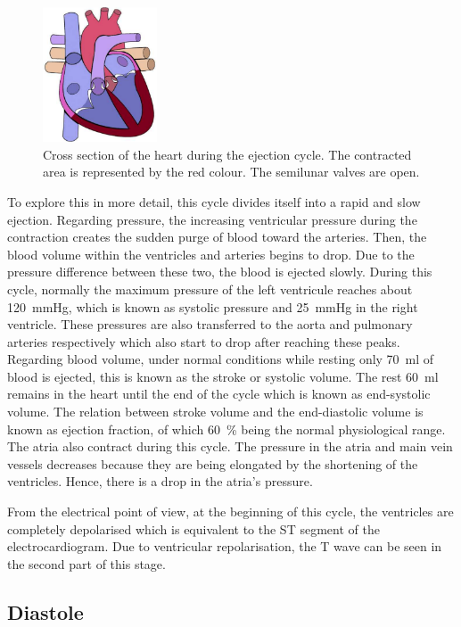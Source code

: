 \begin{figure}[!htpb]
	\centering
	\includegraphics[height=4cm,keepaspectratio]{figure_6}
	\caption[Cross section of the heart during the ejection cycle]{Cross section of the heart during the ejection cycle. The contracted area is represented by the red colour. The semilunar valves are open.}
	\label{fig:heart ejection}
\end{figure}

To explore this in more detail, this cycle divides itself into a rapid and slow ejection. Regarding pressure, the increasing ventricular pressure during the contraction creates the sudden purge of blood toward the arteries. Then, the blood volume within the ventricles and arteries begins to drop. Due to the pressure difference between these two, the blood is ejected slowly. During this cycle, normally the maximum pressure of the left ventricule reaches about \SI{120}{\mmHg}, which is known as systolic pressure and \SI{25}{\mmHg} in the right ventricle. These pressures are also transferred to the aorta and pulmonary arteries respectively which also start to drop after reaching these peaks. Regarding blood volume, under normal conditions while resting only \SI{70}{\milli\litre} of blood is ejected, this is known as the stroke or systolic volume. The rest \SI{60}{\milli\litre} remains in the heart until the end of the cycle which is known as end-systolic volume. The relation between stroke volume and the end-diastolic volume is known as ejection fraction, of which \SI{60}{\percent} being the normal physiological range. The atria also contract during this cycle. The pressure in the atria and main vein vessels decreases because they are being elongated by the shortening of the ventricles. Hence, there is a drop in the atria's pressure. 

From the electrical point of view, at the beginning of this cycle, the ventricles are completely depolarised which is equivalent to the ST segment of the electrocardiogram. Due to ventricular repolarisation, the T wave can be seen in the second part of this stage. 

\subsection{Diastole}
